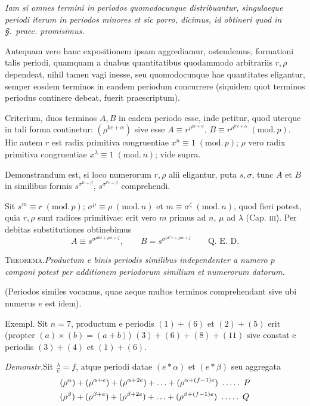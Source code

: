 \emph{Iam si omnes termini in periodos quomodocunque distribuantur, singulaeque periodi iterum in periodos minores et sic porro, dicimus, id obtineri quod in \S.\ praec. promisimus.}

Antequam vero hanc expositionem ipsam aggrediamur, ostendemus, formationi talis periodi, quamquam a duabus quantitatibus quodammodo arbitrariis $r,\rho$ dependeat, nihil tamen vagi inesse, seu quomodocunque hae quantitates eligantur, semper eosdem terminos in eandem periodum concurrere (siquidem quot terminos periodus continere debeat, fuerit praescriptum).

Criterium, duos terminos $A,B$ in eadem periodo esse, inde petitur, quod uterque in tali forma continetur: $(\rho^{ke+\alpha})$ sive esse $A\equiv r^{\rho^{ke+\alpha}}$, $B\equiv r^{\rho^{k'e+\alpha}}\;(\mathrm{mod.}\,p)$. Hic autem $r$ est radix primitiva congruentiae $x^n\equiv1\;(\mathrm{mod.}\,p)$; $\rho$ vero radix primitiva congruentiae $x^\lambda\equiv1\;(\mathrm{mod.}\,n)$; vide supra.

Demonstrandum est, si loco numerorum $r,\rho$ alii eligantur, puta $s,\sigma$, tunc $A$ et $B$ in similibus formis $s^{\sigma^{le+\beta}}$, $s^{\sigma^{l'e+\beta}}$ comprehendi.

%
Sit $s^m\equiv r\;(\mathrm{mod.}\,p)$; $\sigma^\mu\equiv\rho\;(\mathrm{mod.}\,n)$ et $m\equiv\sigma^\zeta\;(\mathrm{mod.}\,n)$, quod fieri potest, quia $r,\rho$ sunt radices primitivae: erit vero $m$ primus ad $n$, $\mu$ ad $\lambda$ (Cap. \textsc{iii}). Per debitas substitutiones obtinebimus
\[
A\equiv s^{\sigma^{\mu ke+\mu\alpha+\zeta}},\qquad B=s^{\sigma^{\mu k'e+\mu\alpha+\zeta}}\qquad\text{Q. E. D.}
\]

\textsc{Theorema.}\quad\emph{Productum e binis periodis similibus independenter a numero $p$ componi potest per additionem periodorum similium et numerorum datorum.}

(Periodos similes vocamus, quae aeque multos terminos comprehendant sive ubi numerus $e$ est idem).

Exempl. Sit $n=7$, productum e periodis $(1)+(6)$ et $(2)+(5)$ erit (propter $(a)\times(b)=(a+b)$) $(3)+(6)+(8)+(11)$ sive constat e periodis $(3)+(4)$ et $(1)+(6)$.

\emph{Demonstr.}\quad Sit $\frac{\lambda}{e}=f$, atque periodi datae $(e\ast\alpha)$ et $(e\ast\beta)$ seu aggregata
\[
\begin{aligned}
&(\rho^\alpha)+(\rho^{\alpha+e})+(\rho^{\alpha+2e})+\ldots+(\rho^{\alpha+(f-1)e})\ \dotsfive\ P\\
&(\rho^\beta)+(\rho^{\beta+e})+(\rho^{\beta+2e})+\ldots+(\rho^{\beta+(f-1)e})\ \dotsfive\ Q
\end{aligned}
\]

